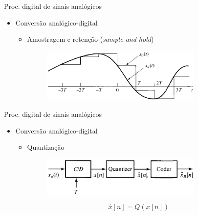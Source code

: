 \documentclass[
size=11pt,
paper=screen,
mode=present,
display=slidesnotes,
style=paintings,
nopagebreaks,
blackslide,
fleqn]{powerdot}
\begin{document}
\begin{slide}{Proc. digital de sinais anal\'ogicos}
\begin{itemize}
   \item Conversão analógico-digital
   \begin{itemize}
      \item Amostragem e retenção (\emph{sample and hold})
      \begin{figure}
        \centering
         \includegraphics[width = 0.8\textwidth]{figs/ad_conv3.eps}
      \end{figure}

   \end{itemize}
\end{itemize}
\end{slide}

\begin{slide}{Proc. digital de sinais anal\'ogicos}
\begin{itemize}
   \item Conversão analógico-digital
   \begin{itemize}
      \item Quantização 
      \begin{figure}
        \centering
         \includegraphics[width = 0.8\textwidth]{figs/ad_conv4.eps}
      \end{figure}
\begin{equation}
          \hat x[n] = Q(x[n])
      \end{equation}
   \end{itemize}
\end{itemize}
\end{slide}
\end{document}
